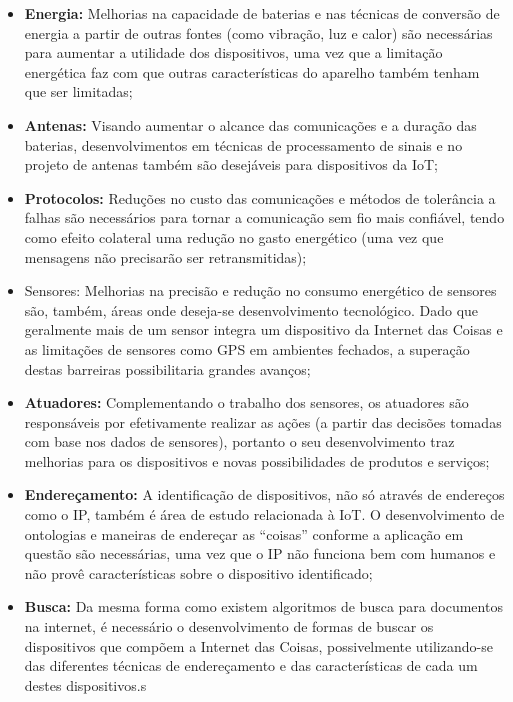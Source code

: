 \documentclass[twoside,english,brazilian]{UNISINOSmonografia}
\begin{document}
\begin{itemize}
	
	\item \textbf{Energia:}
Melhorias na capacidade de baterias e nas técnicas de conversão de energia a 
partir de outras fontes (como vibração, luz e calor) são necessárias para 
aumentar a utilidade dos dispositivos, uma vez que a limitação energética faz 
com que outras características do aparelho também tenham que ser limitadas;
	
	\item \textbf{Antenas:}
Visando aumentar o alcance das comunicações e a duração das baterias, 
desenvolvimentos em técnicas de processamento de sinais e no projeto de 
antenas também são desejáveis para dispositivos da IoT;
	
	\item \textbf{Protocolos:}
Reduções no custo das comunicações e métodos de tolerância a falhas são 
necessários para tornar a comunicação sem fio mais confiável, tendo como 
efeito colateral uma redução no gasto energético (uma vez que mensagens não 
precisarão ser retransmitidas);
	
	\item Sensores:
Melhorias na precisão e redução no consumo energético de sensores são, também, 
áreas onde deseja-se desenvolvimento tecnológico. Dado que geralmente mais de 
um sensor integra um dispositivo da Internet das Coisas e as limitações de 
sensores como GPS em ambientes fechados, a superação destas barreiras 
possibilitaria grandes avanços;
	
	\item \textbf{Atuadores:}
Complementando o trabalho dos sensores, os atuadores são responsáveis por 
efetivamente realizar as ações (a partir das decisões tomadas com base nos 
dados de sensores), portanto o seu desenvolvimento traz melhorias para os 
dispositivos e novas possibilidades de produtos e serviços;
	
	\item \textbf{Endereçamento:}
A identificação de dispositivos, não só através de endereços como o IP, também 
é área de estudo relacionada à IoT. O desenvolvimento de ontologias e maneiras 
de endereçar as ``coisas'' conforme a aplicação em questão são necessárias, 
uma vez que o IP não funciona bem com humanos e não provê características 
sobre o dispositivo identificado;
	
	\item \textbf{Busca:}
Da mesma forma como existem algoritmos de busca para documentos na internet, 
é necessário o desenvolvimento de formas de buscar os dispositivos que compõem 
a Internet das Coisas, possivelmente utilizando-se das diferentes técnicas de 
endereçamento e das características de cada um destes dispositivos.s
	
\end{itemize}
\end{document}
